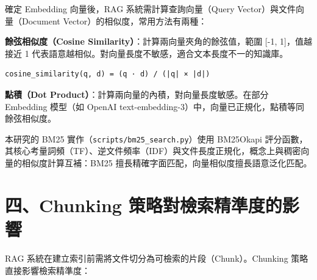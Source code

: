 確定 Embedding 向量後，RAG 系統需計算查詢向量（Query
Vector）與文件向量（Document Vector）的相似度，常用方法有兩種：

\textbf{餘弦相似度（Cosine Similarity）}：計算兩向量夾角的餘弦值，範圍
{[}-1, 1{]}，值越接近 1
代表語意越相似。對向量長度不敏感，適合文本長度不一的知識庫。

\begin{verbatim}
cosine_similarity(q, d) = (q · d) / (|q| × |d|)
\end{verbatim}

\textbf{點積（Dot Product）}：計算兩向量的內積，對向量長度敏感。在部分
Embedding 模型（如 OpenAI
text-embedding-3）中，向量已正規化，點積等同餘弦相似度。

本研究的 BM25 實作（\texttt{scripts/bm25\_search.py}）使用 BM25Okapi
評分函數，其核心考量詞頻（TF）、逆文件頻率（IDF）與文件長度正規化，概念上與稠密向量的相似度計算互補：BM25
擅長精確字面匹配，向量相似度擅長語意泛化匹配。

\section{四、Chunking
策略對檢索精準度的影響}\label{ux56dbchunking-ux7b56ux7565ux5c0dux6aa2ux7d22ux7cbeux6e96ux5ea6ux7684ux5f71ux97ff}

RAG 系統在建立索引前需將文件切分為可檢索的片段（Chunk）。Chunking
策略直接影響檢索精準度：

